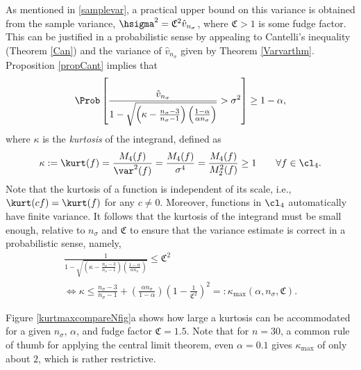\documentclass[graybox]{svmult}
\newcommand{\hv}{\hat{v}}
\newcommand{\fudge}{\mathfrak{C}}
\begin{document}
As mentioned in \eqref{samplevar}, a practical upper bound on this variance is obtained from the sample variance, $\hsigma^2 = \fudge^2 \hv_{n_{\sigma}}$, where $\fudge > 1$ is some fudge factor. This can be justified in a probabilistic sense by appealing to  Cantelli's inequality (Theorem \ref{Can}) and the variance of $\hv_{n_{\sigma}}$ given by Theorem \ref{Varvarthm}.  Proposition \ref{propCant} implies that
\[
\Prob \left[\frac{\hv_{n_{\sigma}}}{1 - \sqrt{\left ( \kappa  - \frac{n_{\sigma}-3}{n_{\sigma}-1}\right)\left(\frac{1-\alpha}{\alpha n_{\sigma}}\right)}} > \sigma^2 \right] \ge 1 - \alpha,
\]
where $\kappa$ is the \emph{kurtosis} of the integrand, defined as
\begin{equation} \label{kurtdef}
\kappa:= \kurt(f) = \frac{M_4(f)}{\var^2(f)} = \frac{M_4(f)}{\sigma^4} = \frac{M_4(f)}{M_2^2(f)} \ge 1 \qquad \forall f \in \cl_4.
\end{equation}
Note that the kurtosis of a function is independent of its scale, i.e., $\kurt(cf)=\kurt(f)$ for any $c \ne 0$.  Moreover, functions in $\cl_4$ automatically have finite variance.  It follows that the kurtosis of the integrand must be small enough, relative to $n_{\sigma}$ and $\fudge$ to ensure that the variance estimate is correct in a probabilistic sense, namely, 
\begin{multline}
\frac{1}{1 - \sqrt{\left ( \kappa  - \frac{n_{\sigma}-3}{n_{\sigma}-1}\right)\left(\frac{1-\alpha}{\alpha n_{\sigma}}\right)}} \le \fudge^2
\\
\iff \kappa \le \frac{n_{\sigma}-3}{n_{\sigma}-1} + \left(\frac{ \alpha n_{\sigma}}{1-\alpha}\right) \left(1 - \frac{1}{\fudge^2}\right)^2 =: \kappa_{\max} (\alpha,n_{\sigma},\fudge). \label{kappamaxdef}
\end{multline}

Figure \ref{kurtmaxcompareNfig}a shows how large a kurtosis can be accommodated for a given $n_{\sigma}$, $\alpha$, and fudge factor $\fudge=1.5$.  Note that for $n=30$, a common rule of thumb for applying the central limit theorem, even $\alpha=0.1$ gives $\kappa_{\max}$ of only about $2$, which is rather restrictive.
\end{document}
